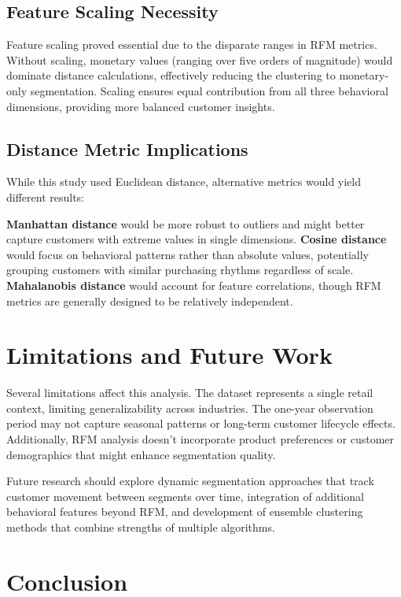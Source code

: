 \documentclass[conference]{IEEEtran}
\begin{document}
\subsection{Feature Scaling Necessity}

Feature scaling proved essential due to the disparate ranges in RFM metrics. Without scaling, monetary values (ranging over five orders of magnitude) would dominate distance calculations, effectively reducing the clustering to monetary-only segmentation. Scaling ensures equal contribution from all three behavioral dimensions, providing more balanced customer insights.

\subsection{Distance Metric Implications}

While this study used Euclidean distance, alternative metrics would yield different results:

\textbf{Manhattan distance} would be more robust to outliers and might better capture customers with extreme values in single dimensions. \textbf{Cosine distance} would focus on behavioral patterns rather than absolute values, potentially grouping customers with similar purchasing rhythms regardless of scale. \textbf{Mahalanobis distance} would account for feature correlations, though RFM metrics are generally designed to be relatively independent.

\section{Limitations and Future Work}

Several limitations affect this analysis. The dataset represents a single retail context, limiting generalizability across industries. The one-year observation period may not capture seasonal patterns or long-term customer lifecycle effects. Additionally, RFM analysis doesn't incorporate product preferences or customer demographics that might enhance segmentation quality.

Future research should explore dynamic segmentation approaches that track customer movement between segments over time, integration of additional behavioral features beyond RFM, and development of ensemble clustering methods that combine strengths of multiple algorithms.

\section{Conclusion}
\end{document}
